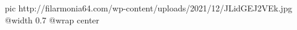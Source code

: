  
 
 
 
 

\ifcmt
  pic http://filarmonia64.com/wp-content/uploads/2021/12/JLidGEJ2VEk.jpg
  @width 0.7
  @wrap center
\fi
